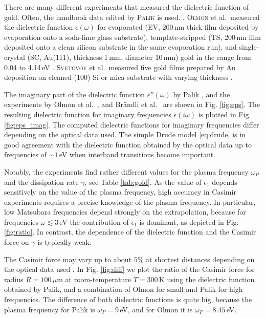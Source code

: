 \documentclass[twocolumn,superscriptaddress,pre]{revtex4-1}
\begin{document}
There are many different experiments that measured the dielectric function of
gold. Often, the handbook data edited by \textsc{Palik} is used.
\cite{Palik1995}. \textsc{Olmon} et al.\ measured the dielectric function
$\epsilon(\omega)$ for evaporated (EV, 200\,nm thick film deposited by
evaporation onto a soda-lime glass substrate), template-stripped (TS, 200\,nm
film deposited onto a clean silicon substrate in the same evaporation run), and
single-crystal (SC, Au(111), thickness 1\,mm, diameter 10\,mm) gold in the range
from 0.04 to 4.14\,eV \cite{Olmon2012}. \textsc{Svetovoy} et al.\ measured five
gold films prepared by Au deposition on cleaned (100) Si or mica substrate with
varying thickness \cite{Svetovoy2008}.

The imaginary part of the dielectric function $\epsilon''(\omega)$ by Palik
\cite{Palik1995}, and the experiments by Olmon et al.\ \cite{Olmon2012}, and
Br\"andli et al.\ \cite{Brandli1972} are shown in Fig.  \ref{fig:eps}. The
resulting dielectric function for imaginary frequencies $\epsilon(i\omega)$ is
plotted in Fig. \ref{fig:eps_imag}. The computed dielectric functions for
imaginary frequencies differ depending on the optical data used. The
simple Drude model \eqref{eq:drude} is in good agreement with the dielectric
function obtained by the optical data up to frequencies of $\sim 1\,$eV when
interband transitions become important.

Notably, the experiments find rather different values for the plasma frequency
$\omega_P$ and the dissipation rate $\gamma$, see Table \ref{tab:gold}. As the
value of $\epsilon_1$ depends sensitively on the value of the plasma frequency, high
accuracy in Casimir experiments requires a precise knowledge of the plasma
frequency. In particular, low Matsubara frequencies depend strongly on the
extrapolation, because for frequencies $\omega \lesssim 3\,$eV the contribution
of $\epsilon_1$ is dominant, as depicted in Fig. \ref{fig:ratio}. In
contrast, the dependence of the dielectric function and the Casimir force on
$\gamma$ is typically weak.

The Casimir force may vary up to about $5\%$ at shortest distances depending
on the optical data used \cite{Pirozhenko2006}.
In Fig. \ref{fig:diff} we plot the ratio
of the Casimir force for radius $R=100\,\mu$m at room-temperature $T=300\,$K
using the dielectric function obtained by Palik, and a combination of Olmon for
small and Palik for high frequencies. The difference of both dielectric
functions is quite big, because the plasma frequency for Palik is
$\omega_P=9\,$eV, and for Olmon it is $\omega_P=8.45\,$eV.
\end{document}
